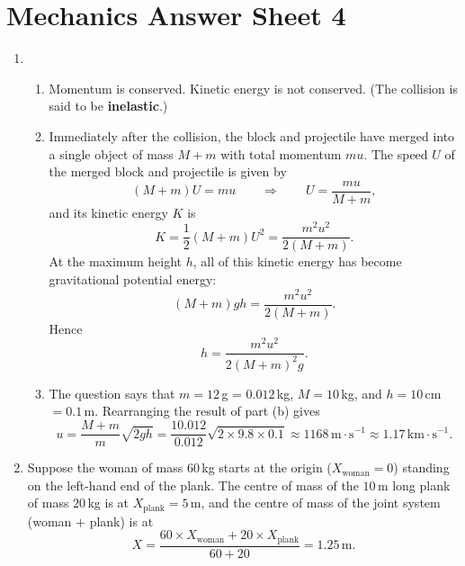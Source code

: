 \documentclass[12pt]{article}
\begin{document}
\section*{Mechanics Answer Sheet 4} 

\begin{enumerate}
  \item
  \begin{enumerate}

  \item Momentum is conserved. Kinetic energy is not conserved. (The
    collision is said to be \textbf{inelastic}.)

  \item Immediately after the collision, the block and projectile have
    merged into a single object of mass $M+m$ with total momentum $mu$.
    The speed $U$ of the merged block and projectile is given by
    \begin{displaymath}
      (M + m)U = mu \qquad \Rightarrow \qquad U = \frac{mu}{M+m} ,
    \end{displaymath}
    and its kinetic energy $K$ is
    \begin{displaymath}
      K = \frac{1}{2}(M+m)U^2 = \frac{m^2 u^2}{2(M+m)}.
    \end{displaymath}
    At the maximum height $h$, all of this kinetic energy has become
    gravitational potential energy:
    \begin{displaymath}
      (M+m)gh =  \frac{m^2 u^2}{2(M+m)}.
    \end{displaymath}
    Hence
    \begin{displaymath}
      h = \frac{m^2 u^2}{2(M+m)^2 g}.
    \end{displaymath}

  \item The question says that $m = 12\,$g = $0.012\,$kg, $M = 10\,$kg,
    and $h = 10\,$cm $= 0.1\,$m. Rearranging the result of part (b)
    gives
    \begin{displaymath}
      u = \frac{M+m}{m} \sqrt{2gh}
          = \frac{10.012}{0.012} \sqrt{2 \times 9.8 \times 0.1} \approx
          1168 \, \text{m}\cdot\text{s}^{-1} \approx 1.17\,\text{km}\cdot\text{s}^{-1}.
    \end{displaymath}

  \end{enumerate}
  
\item Suppose the woman of mass $60\,$kg starts at the origin
  ($X_{\text{woman}} = 0$) standing on the left-hand end of the plank.
  The centre of mass of the $10\,$m long plank of mass $20\,$kg is at
  $X_{\text{plank}} = 5\,$m, and the centre of mass of the joint system
  (woman $+$ plank) is at
  \[
    X = \frac{60 \times X_{\text{woman}} + 20 \times X_{\text{plank}}}
    {60 + 20} = 1.25\,\text{m}.
  \]


\end{enumerate}
\end{document}
